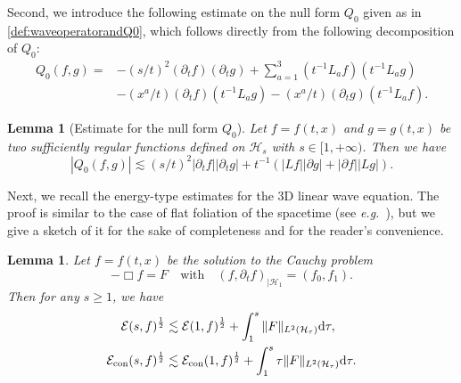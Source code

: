 \documentclass[a4paper,reqno]{amsart}
\newtheorem{lemma}[theorem]{Lemma}
\theoremstyle{definition}
\numberwithin{equation}{section}
\def \pt{\partial_{t}}
\begin{document}
Second, we introduce the following estimate {on} the null form $Q_{0}$ given as in \eqref{def:waveoperatorandQ0}, which follows directly from the following decomposition of $Q_{0}$: 
\begin{equation*}
 \begin{aligned}
  Q_{0}(f,g)=&-(s/t)^{2}(\pt f)(\pt g)+\sum_{a=1}^{3}(t^{-1}L_{a}f)(t^{-1}L_{a}g)\\
  &-(x^{a}/t)(\pt f)(t^{-1}L_{a}g)
  -(x^{a}/t)(\pt g)(t^{-1}L_{a}f).
  \end{aligned}
 \end{equation*}
 
 \begin{lemma}[Estimate for the null form {$Q_0$}]\label{le:null}
     Let $f=f(t,x)$ and $g=g(t,x)$ be two sufficiently regular functions defined on $\mathcal{H}_{s}$ with $s\in [1,+\infty)$. Then we have 
     \begin{equation*}
         \left|Q_{0}(f,g)\right|\lesssim 
         (s/t)^{2}
         |\partial_{t}f||\partial_{t}g|
         +t^{-1}
         \left(\left|Lf\right|\left|\partial g\right|
         +\left|\partial f\right|\left|L g\right|
         \right).
     \end{equation*}
 \end{lemma}

Next, we recall the energy-type estimates for the 3D linear wave equation. The proof is similar to the case of flat foliation of the spacetime (see \emph{e.g.}~\cite[Chapter 6]{AlinhacBook}), but we give a sketch of it for the sake of completeness and for the reader’s convenience.
 \begin{lemma}\label{le:energy}
 Let $f=f(t,x)$ be the solution to the Cauchy problem
 \begin{equation*}
     -\Box f=F\quad \mbox{with}\quad (f,\pt f)_{|\mathcal{H}_{1}}=(f_{0},f_{1}).
     \end{equation*}
 Then for any $s\geq 1$, we have 
 \begin{equation*}
 \begin{aligned}
     \mathcal{E}(s,f)^{\frac{1}{2}} &\lesssim
     \mathcal{E}(1,f)^{\frac{1}{2}}+\int_{1}^{s}\|F\|_{L^{2}(\mathcal{H}_{\tau})}\mathrm{d} \tau,\\
     \mathcal{E}_{\rm{con}}(s,f)^{\frac{1}{2}} &\lesssim
     \mathcal{E}_{\rm{con}}(1,f)^{\frac{1}{2}}+\int_{1}^{s}\tau\|F\|_{L^{2}(\mathcal{H}_{\tau})}\mathrm{d} \tau.
     \end{aligned}
 \end{equation*}
     \end{lemma}
\end{document}
